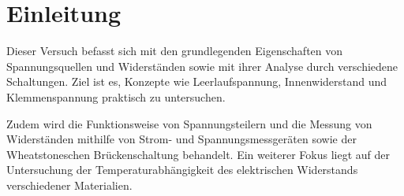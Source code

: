 \section{Einleitung}
Dieser Versuch befasst sich mit den grundlegenden Eigenschaften von Spannungsquellen und Widerständen sowie mit ihrer Analyse durch verschiedene Schaltungen. Ziel ist es, Konzepte wie Leerlaufspannung, Innenwiderstand und Klemmenspannung praktisch zu untersuchen.

Zudem wird die Funktionsweise von Spannungsteilern und die Messung von Widerständen mithilfe von Strom- und Spannungsmessgeräten sowie der Wheatstoneschen Brückenschaltung behandelt. Ein weiterer Fokus liegt auf der Untersuchung der Temperaturabhängigkeit des elektrischen Widerstands verschiedener Materialien.